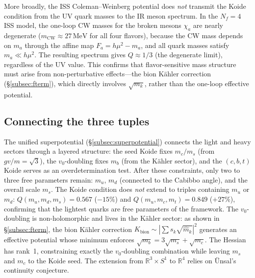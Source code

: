 \documentclass[12pt,a4paper]{article}
\newcommand{\MeV}{\,\text{MeV}}
\begin{document}
More broadly, the ISS Coleman--Weinberg potential does \emph{not}
transmit the Koide condition from the UV quark masses to the IR
meson spectrum.  In the $N_f = 4$ ISS model, the one-loop CW
masses for the broken mesons $\chi_a$ are nearly degenerate
($m_{\text{CW}} \approx 27\MeV$ for all four flavors), because
the CW mass depends on $m_a$ through the affine map
$F_a = h\mu^2 - m_a$, and all quark masses satisfy
$m_a \ll h\mu^2$.  The resulting spectrum gives
$Q \approx 1/3$ (the degenerate limit), regardless of the UV
value.  This confirms that flavor-sensitive mass structure must
arise from non-perturbative effects---the bion K\"ahler
correction (\S\ref{subsec:fterm}), which directly involves
$\sqrt{m_k}$, rather than the one-loop effective potential.

\subsection{Connecting the three tuples}
The unified superpotential (\S\ref{subsec:superpotential}) connects
the light and heavy sectors through a layered structure:
the seed Koide fixes $m_c/m_s$ (from $gv/m = \sqrt{3}$),
the $v_0$-doubling fixes $m_b$ (from the K\"ahler sector),
and the $(c,b,t)$ Koide serves as an overdetermination test.
After these constraints, only two to three free parameters remain:
$m_u$, $m_d$ (connected to the Cabibbo angle), and the overall
scale $m_s$.  The Koide condition does \emph{not} extend to triples
containing $m_u$ or $m_d$: $Q(m_u,m_d,m_s) = 0.567$ ($-15\%$)
and $Q(m_u,m_c,m_t) = 0.849$ ($+27\%$), confirming that the
lightest quarks are free parameters of the framework. The $v_0$-doubling is non-holomorphic and lives in the
K\"ahler sector: as shown in \S\ref{subsec:fterm}, the bion
K\"ahler correction $K_{\text{bion}} \sim |\!\sum s_k\sqrt{\hat m_k}|^2$
generates an effective potential whose minimum enforces
$\sqrt{m_b} = 3\sqrt{m_s} + \sqrt{m_c}$.
The Hessian has rank~1, constraining exactly the $v_0$-doubling
combination while leaving $m_s$ and $m_c$ to the Koide seed.
The extension from $\mathbb{R}^3 \times S^1$ to
$\mathbb{R}^4$ relies on \"Unsal's continuity conjecture.
\end{document}
